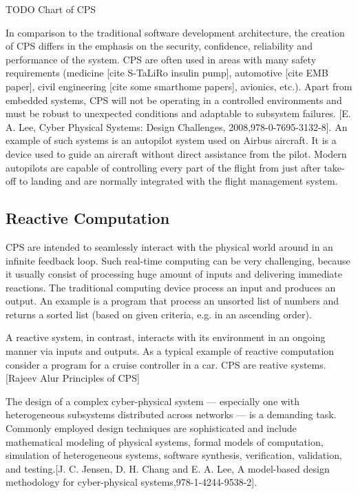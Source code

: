 TODO Chart of CPS

In comparison to the traditional software development architecture, the creation of CPS differs in the emphasis on the security, confidence, reliability and performance of the system. CPS are often used in areas with many safety requirements (medicine [cite S-TaLiRo insulin pump], automotive [cite EMB paper], civil engineering [cite some smarthome papers], avionics, etc.). Apart from embedded systems, CPS will not be operating in a controlled environments and must be robust to unexpected conditions and adaptable to subsystem failures. [E. A. Lee, Cyber Physical Systems: Design Challenges, 2008,978-0-7695-3132-8]. An example of such systems is an autopilot system used on Airbus aircraft. It is a device used to guide an aircraft without direct assistance from the pilot. Modern autopilots are capable of controlling every part of the flight from just after take-off to landing and are normally integrated with the flight management system.

\subsection{Reactive Computation}

CPS are intended to seamlessly interact with the physical world around in an infinite feedback loop. Such real-time computing can be very challenging, because it usually consist of processing huge amount of inputs and delivering immediate reactions. The traditional computing device process an input and produces an output. An example is a program that process an unsorted list of numbers and returns a sorted list (based on given criteria, e.g. in an ascending order).

A reactive system, in contrast, interacts with its environment in an ongoing manner via inputs and outputs. As a typical example of reactive computation consider a program for a cruise controller in a car. CPS are reative systems.[Rajeev Alur Principles of CPS]

The design of a complex cyber-physical system — especially one with heterogeneous subsystems distributed across networks — is a demanding task. Commonly employed design techniques are sophisticated and include mathematical modeling of physical systems, formal models of computation, simulation of heterogeneous systems, software synthesis, verification, validation, and testing.[J. C. Jensen, D. H. Chang and E. A. Lee, A model-based design methodology for cyber-physical systems,978-1-4244-9538-2].

